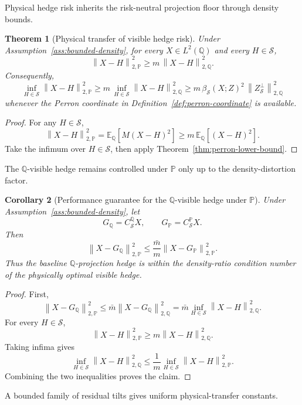\documentclass[11pt,a4paper]{amsart}
\theoremstyle{plain}
\newtheorem{theorem}{Theorem}[section]
\newtheorem{corollary}[theorem]{Corollary}
\theoremstyle{definition}
\theoremstyle{remark}
\newcommand{\PP}{\mathbb{P}}
\newcommand{\QQ}{\mathbb{Q}}
\newcommand{\EE}{\mathbb{E}}
\newcommand{\cS}{\mathcal{S}}
\newcommand{\norm}[1]{\left\lVert #1\right\rVert}
\begin{document}
Physical hedge risk inherits the risk-neutral projection floor through density bounds.

\begin{theorem}[Physical transfer of visible hedge risk]\label{thm:physical-transfer}
Under Assumption~\ref{ass:bounded-density}, for every \(X\in L^2(\QQ)\) and every \(H\in\cS\),
\[
        \norm{X-H}_{2,\PP}^2
        \ge
        m\,\norm{X-H}_{2,\QQ}^2.
\]
Consequently,
\[
        \inf_{H\in\cS}\norm{X-H}_{2,\PP}^2
        \ge
        m\,\inf_{H\in\cS}\norm{X-H}_{2,\QQ}^2
        \ge
        m\,\beta_{\cS}(X;Z)^2\,\norm{Z_{\cS}^{\perp}}_{2,\QQ}^2
\]
whenever the Perron coordinate in Definition~\ref{def:perron-coordinate} is available.
\end{theorem}

\begin{proof}
For any \(H\in\cS\),
\[
        \norm{X-H}_{2,\PP}^2
        =
        \EE_\QQ[M(X-H)^2]
        \ge
        m\,\EE_\QQ[(X-H)^2].
\]
Take the infimum over \(H\in\cS\), then apply Theorem~\ref{thm:perron-lower-bound}.
\end{proof}

The \(\QQ\)-visible hedge remains controlled under \(\PP\) only up to the density-distortion factor.

\begin{corollary}[Performance guarantee for the \(\QQ\)-visible hedge under \(\PP\)]\label{cor:q-hedge-under-p}
Under Assumption~\ref{ass:bounded-density}, let
\[
        G_\QQ=C_{\cS}^{\QQ}X,
        \qquad
        G_\PP=C_{\cS}^{\PP}X.
\]
Then
\[
        \norm{X-G_\QQ}_{2,\PP}^{2}
        \le
        \frac{\bar m}{m}
        \norm{X-G_\PP}_{2,\PP}^{2}.
\]
Thus the baseline \(\QQ\)-projection hedge is within the density-ratio condition number of the
physically optimal visible hedge.
\end{corollary}

\begin{proof}
First,
\[
        \norm{X-G_\QQ}_{2,\PP}^2
        \le
        \bar m\norm{X-G_\QQ}_{2,\QQ}^2
        =
        \bar m\inf_{H\in\cS}\norm{X-H}_{2,\QQ}^2.
\]
For every \(H\in\cS\),
\[
        \norm{X-H}_{2,\PP}^2\ge m\norm{X-H}_{2,\QQ}^2.
\]
Taking infima gives
\[
        \inf_{H\in\cS}\norm{X-H}_{2,\QQ}^2
        \le
        \frac1m\inf_{H\in\cS}\norm{X-H}_{2,\PP}^2.
\]
Combining the two inequalities proves the claim.
\end{proof}

A bounded family of residual tilts gives uniform physical-transfer constants.
\end{document}
